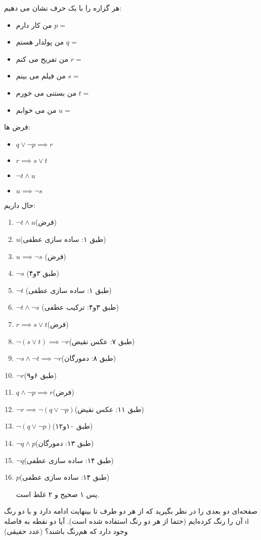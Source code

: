 \documentclass[11pt,largemargins]{h2wp}
\begin{document}
هر گزاره را با یک حرف نشان می دهیم:
\begin{itemize}
\item من کار دارم $p= $
\item من پولدار هستم $q= $ 
\item من تفریح می کنم $r= $ 
\item من فیلم می بینم $s= $ 
\item من بستنی می خورم $t= $ 
\item من می خوابم $u= $ 
\end{itemize}
فرض ها:
\begin{itemize}
\item $q \lor \neg p\implies r$
\item $r\implies s\lor t$
\item $\neg t \land u$
\item $u \implies \neg s$
\end{itemize}
حال داریم:
\begin{enumerate}
\item $\neg t \land u$(فرض) 
\item $u$(طبق ۱: ساده سازی عطفی)
\item $u \implies \neg s$ (فرض)
\item $\neg s$ (طبق ۳و۴)
\item $\neg t$ (طبق ۱: ساده سازی عطفی)
\item $\neg t \land \neg s$ (طبق ۳و۴: ترکیب عطفی)
\item $r\implies s\lor t$(فرض)
\item $\neg(s\lor t)\implies \neg r$(طبق ۷: عکس نقیض)
\item $\neg s \land \neg t \implies \neg r$(طبق ۸: دمورگان)
\item $\neg r$(طبق ۶و۹)
\item $q \land \neg p\implies r$(فرض)
\item $\neg r \implies \neg(q \lor \neg p)$(طبق ۱۱: عکس نقیض)
\item $\neg(q \lor \neg p)$(طبق ۱۰و۱۲)
\item $\neg q \land p$(طبق ۱۳: دمورگان)
\item $\neg q$(طبق ۱۴: ساده سازی عطفی)
\item $p$(طبق ۱۴: ساده سازی عطفی)

پس ۱ صحیح و ۲ غلط است.
\end{enumerate}



\question

صفحه‌ای دو بعدی را در نظر بگیرید که از هر دو طرف تا بینهایت ادامه دارد و با دو رنگ آن را رنگ کرده‌ایم (حتما از هر دو رنگ استفاده شده است). آیا دو نقطه به فاصله d (عدد حقیقی) وجود دارد که هم‌رنگ باشند؟
\end{document}
